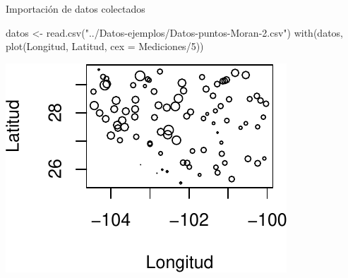 \documentclass[
  11pt,
  ignorenonframetext,
]{beamer}
\newenvironment{Shaded}{}{}
\newcommand{\AttributeTok}[1]{\textcolor[rgb]{0.49,0.56,0.16}{#1}}
\newcommand{\DecValTok}[1]{\textcolor[rgb]{0.25,0.63,0.44}{#1}}
\newcommand{\FunctionTok}[1]{\textcolor[rgb]{0.02,0.16,0.49}{#1}}
\newcommand{\NormalTok}[1]{#1}
\newcommand{\OtherTok}[1]{\textcolor[rgb]{0.00,0.44,0.13}{#1}}
\newcommand{\SpecialCharTok}[1]{\textcolor[rgb]{0.25,0.44,0.63}{#1}}
\newcommand{\StringTok}[1]{\textcolor[rgb]{0.25,0.44,0.63}{#1}}
\begin{document}
\begin{frame}[fragile]{Importación de datos colectados}
\protect\hypertarget{importaciuxf3n-de-datos-colectados}{}
\begin{Shaded}
\begin{Highlighting}[]
\NormalTok{datos }\OtherTok{\textless{}{-}} \FunctionTok{read.csv}\NormalTok{(}\StringTok{"../Datos{-}ejemplos/Datos{-}puntos{-}Moran{-}2.csv"}\NormalTok{)}
\FunctionTok{with}\NormalTok{(datos, }\FunctionTok{plot}\NormalTok{(Longitud, Latitud, }\AttributeTok{cex =}\NormalTok{ Mediciones}\SpecialCharTok{/}\DecValTok{5}\NormalTok{))}
\end{Highlighting}
\end{Shaded}

\begin{center}\includegraphics{Usos-Moran_files/figure-beamer/unnamed-chunk-1-1} \end{center}
\end{frame}
\end{document}
